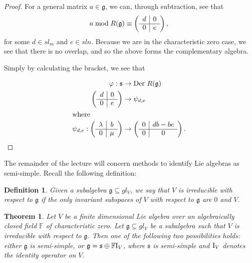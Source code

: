 \documentclass{amsart}
\newtheorem*{Theorem}{Theorem}
\newtheorem*{Def}{Definition}
\newcommand*{\g}{\mathfrak{g}}
\begin{document}
\begin{proof}
For a general matrix $a \in \g$, we can, through subtraction, see that
$$a \bmod R(\g) \equiv  \left( \begin{array}{c|c}
d & 0 \\ \cline{1-2} 
0 & e 
\end{array}\right),$$ for some $d \in sl_{m}$ and $e \in sl{n}$.
Because we are in the characteristic zero case, we see that there is
no overlap, and so the above forms the complementary algebra.

Simply by calculating the bracket, we see that 

\begin{align*}
\varphi: \mathfrak{s} & \rightarrow \textnormal{Der }R(\g) \\
\left( \begin{array}{c|c}
d & 0 \\ \cline{1-2} 
0 & e 
\end{array}\right) & \rightarrow \psi_{d,e} \\
\intertext{where } \psi_{d,e}:\left( \begin{array}{c|c}
\lambda & b \\ \cline{1-2} 
0 & \mu 
\end{array}\right) & \rightarrow \left( \begin{array}{c|c}
0 & db-be \\ \cline{1-2} 
0 & 0 
\end{array}\right).
\end{align*}

\end{proof}

The remainder of the lecture will concern methods to identify Lie
algebras as semi-simple.  Recall the following definition:

\begin{Def} Given a subalgebra $\g \subseteq gl_{V}$, we say that $V$
  is irreducible with respect to $\g$ if the only invariant subspaces
  of $V$ with respect to $\g$ are $0$ and $V$.
\end{Def}

\begin{Theorem}
Let $V$ be a finite dimensional Lie algebra over an algebraically
closed field $\mathbb{F}$ of characteristic zero.  Let $\mathfrak{g}
\subseteq gl_{V}$ be a subalgebra such that $V$ is irreducible with
respect to $\g$.  Then one of the following two possibilities holds:
either $\g$ is semi-simple, or 
$\g = \mathfrak{s} \oplus \mathbb{F}\textnormal{I}_{V}$, where
$\mathfrak{s}$ is semi-simple and $\textnormal{I}_{V}$ denotes the
identity operator on $V$.
\end{Theorem}
\end{document}
